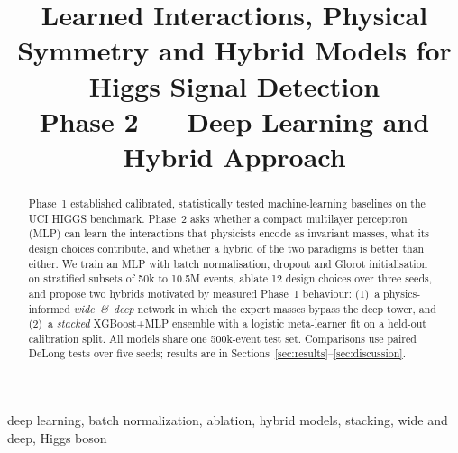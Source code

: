 \documentclass[conference]{IEEEtran}
\begin{document}
\title{Learned Interactions, Physical Symmetry and Hybrid Models for Higgs Signal Detection\\
\large Phase 2 --- Deep Learning and Hybrid Approach}

\author{
}

\maketitle

\begin{abstract}
Phase~1 established calibrated, statistically tested machine-learning baselines on the UCI HIGGS
benchmark. Phase~2 asks whether a compact multilayer perceptron (MLP) can learn the interactions
that physicists encode as invariant masses, what its design choices contribute, and whether a
hybrid of the two paradigms is better than either. We train an MLP with batch normalisation,
dropout and Glorot initialisation on stratified subsets of 50k to 10.5M events, ablate 12 design
choices over three seeds, and propose two hybrids motivated by measured Phase~1 behaviour:
(1)~a physics-informed \emph{wide~\&~deep} network in which the expert masses bypass the deep tower,
and (2)~a \emph{stacked} XGBoost+MLP ensemble with a logistic meta-learner fit on a held-out
calibration split. All models share one 500k-event test set. Comparisons use paired DeLong tests
over five seeds; results are in Sections~\ref{sec:results}--\ref{sec:discussion}.
\end{abstract}

\begin{IEEEkeywords}
deep learning, batch normalization, ablation, hybrid models, stacking, wide and deep, Higgs boson
\end{IEEEkeywords}

\end{document}

